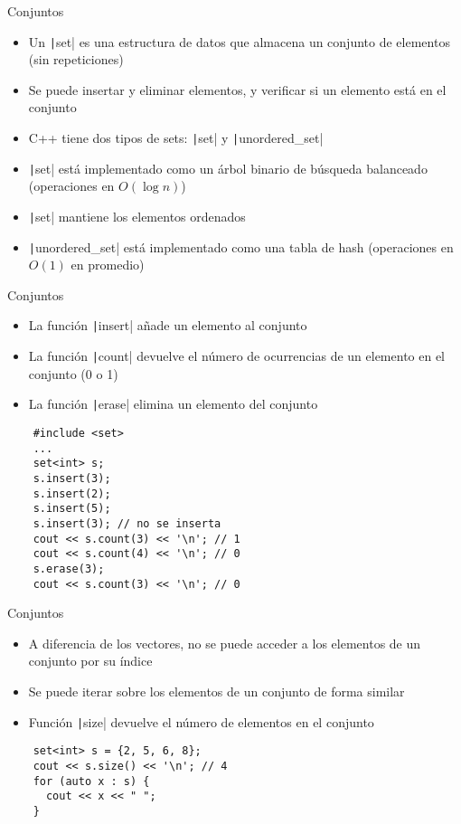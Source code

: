 \documentclass[10pt]{beamer}
\newcommand{\bi}{\begin{itemize}}
\newcommand{\ei}{\end{itemize}}
\begin{document}
\begin{frame}[fragile]{Conjuntos}
  \bi
    \item Un \texttt|set| es una estructura de datos que almacena un conjunto de elementos (sin repeticiones)
    \item Se puede insertar y eliminar elementos, y verificar si un elemento está en el conjunto
    \item C++ tiene dos tipos de sets: \texttt|set| y \texttt|unordered_set|
    \item \texttt|set| está implementado como un árbol binario de búsqueda balanceado (operaciones en $O(\log n)$)
    \item \texttt|set| mantiene los elementos ordenados
    \item \texttt|unordered_set| está implementado como una tabla de hash (operaciones en $O(1)$ en promedio)
  \ei
\end{frame}

\begin{frame}[fragile]{Conjuntos}
  \bi
    \item La función \texttt|insert| añade un elemento al conjunto
    \item La función \texttt|count| devuelve el número de ocurrencias de un elemento en el conjunto (0 o 1)
    \item La función \texttt|erase| elimina un elemento del conjunto
  \ei
  \begin{verbatim}
    #include <set>
    ...
    set<int> s;
    s.insert(3);
    s.insert(2);
    s.insert(5);
    s.insert(3); // no se inserta
    cout << s.count(3) << '\n'; // 1
    cout << s.count(4) << '\n'; // 0
    s.erase(3);
    cout << s.count(3) << '\n'; // 0
  \end{verbatim}
\end{frame}

\begin{frame}[fragile]{Conjuntos}
  \bi
    \item A diferencia de los vectores, no se puede acceder a los elementos de un conjunto por su índice
    \item Se puede iterar sobre los elementos de un conjunto de forma similar
    \item Función \texttt|size| devuelve el número de elementos en el conjunto
  \ei
  \begin{verbatim}
    set<int> s = {2, 5, 6, 8};
    cout << s.size() << '\n'; // 4
    for (auto x : s) {
      cout << x << " ";
    }
  \end{verbatim}
\end{frame}
\end{document}
